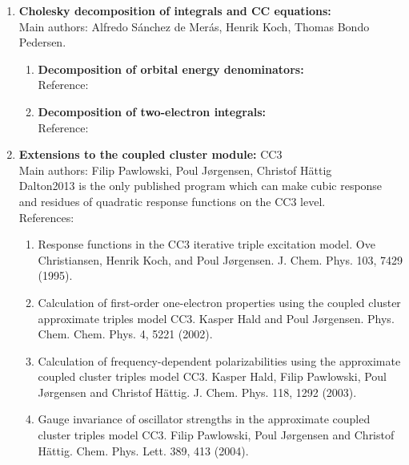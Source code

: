 \begin{enumerate}

\item{\bf Cholesky decomposition of integrals and CC equations:} \\
Main authors: Alfredo S{\'a}nchez {de Mer{\'a}s}, Henrik Koch,
Thomas Bondo Pedersen.
\begin{enumerate}
  \item{\bf Decomposition of orbital energy denominators:}  \\
   Reference: 
   \cite{jcp_chopt}
  \item{\bf Decomposition of two-electron integrals:}  \\
   Reference: 
   \cite{choint}
\end{enumerate}

\item{\bf Extensions to the coupled cluster module:} CC3 \\
Main authors: Filip Pawlowski, Poul J\o rgensen, Christof H\"{a}ttig \\
Dalton2013 is the only published program which can make cubic response
and residues of quadratic response functions on the CC3 level. \\
   References:
\begin{enumerate}
\item	Response functions in the CC3 iterative triple excitation model.
Ove Christiansen, Henrik Koch, and Poul J\o rgensen.
J. Chem. Phys. 103, 7429 (1995).

\item	Calculation of first-order one-electron properties using the
coupled cluster approximate triples model CC3.
Kasper Hald and Poul J\o rgensen.
Phys. Chem. Chem. Phys. 4, 5221 (2002).

\item	Calculation of frequency-dependent polarizabilities using the
approximate coupled cluster triples model CC3.
Kasper Hald, Filip Pawlowski, Poul J\o rgensen and Christof H\"{a}ttig.
J. Chem. Phys. 118, 1292 (2003).

\item	Gauge invariance of oscillator strengths in the approximate
coupled
cluster triples model CC3.
Filip Pawlowski, Poul J\o rgensen and Christof H\"{a}ttig.
Chem. Phys. Lett. 389, 413 (2004).


\end{enumerate}
\end{enumerate}
